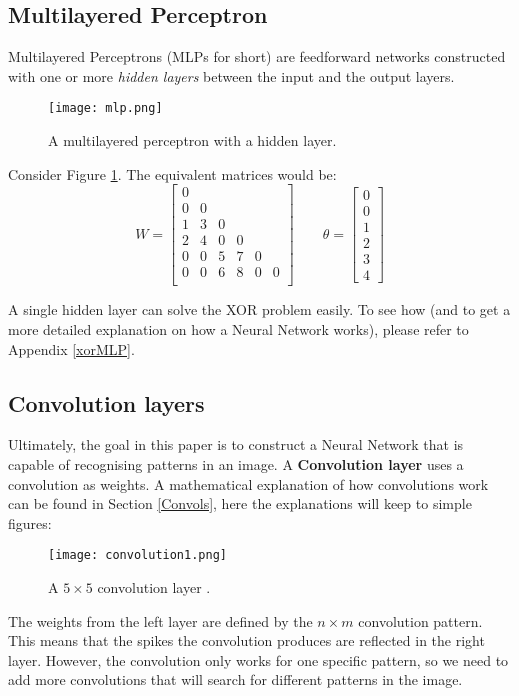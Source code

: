 \documentclass[titlepage]{article}
\theoremstyle{plain}
\theoremstyle{definition}
\begin{document}
		\subsection{Multilayered Perceptron} \label{MLPs}
		Multilayered Perceptrons (MLPs for short) are feedforward networks constructed with one or more \textit{hidden layers} between the input and the output layers.
		\begin{figure}[H]
			\centering
			\texttt{[image: mlp.png]}
			\caption{A multilayered perceptron with a hidden layer.}
			\label{fig:mlp1}
		\end{figure}
		Consider Figure \ref{fig:mlp1}. The equivalent matrices would be:
		$$
		W = \begin{bmatrix}
		0 \\
		0 & 0 \\
		1 & 3 & 0 \\
		2 & 4 & 0 & 0 \\
		0 & 0 & 5 & 7 & 0 \\
		0 & 0 & 6 & 8 & 0 & 0 \\
		\end{bmatrix}
		\qquad
		\theta = \begin{bmatrix}
		0 \\ 0 \\ 1 \\ 2 \\ 3\\ 4\end{bmatrix}
		$$		
		
		A single hidden layer can solve the XOR problem easily. To see how (and to get a more detailed explanation on how a Neural Network works), please refer to Appendix \ref{xorMLP}.\\
		
		\subsection{Convolution layers}
		
		Ultimately, the goal in this paper is to construct a Neural Network that is capable of recognising patterns in an image. A \textbf{Convolution layer} uses a convolution as weights. A mathematical explanation of how convolutions work can be found in Section \ref{Convols}, here the explanations will keep to simple figures:
		\begin{figure}[H]
			\centering
			\texttt{[image: convolution1.png]}
			\caption{A $5\times5$ convolution layer \cite{Nielsen}.}
			\label{fig:convolution1}
		\end{figure}
		The weights from the left layer are defined by the $n \times m$ convolution pattern. This means that the spikes the convolution produces are reflected in the right layer. However, the convolution only works for one specific pattern, so we need to add more convolutions that will search for different patterns in the image.
		
\end{document}
